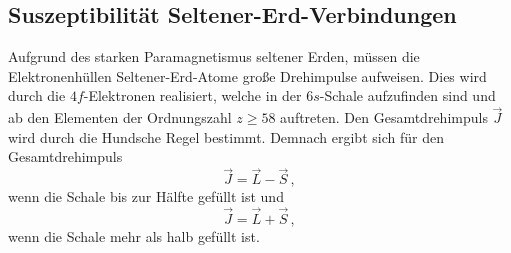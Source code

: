 \subsection{Suszeptibilität Seltener-Erd-Verbindungen}
\label{sec:Suszeptibilität_Selterner_Erden}
Aufgrund des starken Paramagnetismus seltener Erden, müssen die Elektronenhüllen Seltener-Erd-Atome große Drehimpulse
aufweisen. Dies wird durch die $4f$-Elektronen realisiert, welche in der $6s$-Schale aufzufinden sind und ab den Elementen
der Ordnungszahl $z \geq 58$ auftreten. Den Gesamtdrehimpuls $\vec{J}$ wird durch die Hundsche Regel bestimmt. Demnach ergibt sich für den Gesamtdrehimpuls
\begin{equation}
    \vec{J}=\vec{L} - \vec{S}\,,
    \label{eqn:HundscheRegel_minus}
\end{equation}
wenn die Schale bis zur Hälfte gefüllt ist und 
\begin{equation}
    \vec{J}=\vec{L} + \vec{S}\,,
    \label{eqn:HundscheRegel_plus}
\end{equation}
wenn die Schale mehr als halb gefüllt ist.

